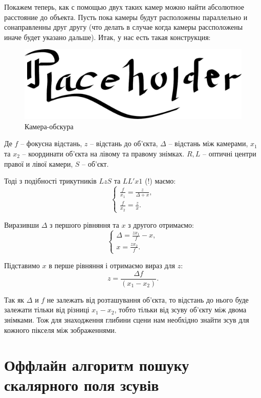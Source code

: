 Покажем теперь, как с помощью двух таких камер можно найти абсолютное расстояние до объекта. Пусть пока камеры будут расположены параллельно и сонаправленны друг другу (что делать в случае когда камеры рассположены иначе будет указано дальше).
Итак, у нас есть такая конструкция:
\begin{figure}[h!]
	\centering
	\includegraphics[scale = 0.7]{placeholder.pdf}
	\caption{Камера-обскура}
	\label{1.1.1 - Camera-obscura}
\end{figure}

Де $f$ -- фокусна відстань, $z$ -- відстань до об'єкта, $\Delta$ -- відстань між камерами, $x_1$ та $x_2$ -- координати об'єкта на лівому та правому знімках. $R, L$ -- оптичні центри правої и лівої камери, $S$ -- об'єкт.
	
Тоді з подібності трикутників $LzS$ та $LL'x1$ (!) маємо:
$$\begin{cases} \frac{f}{x_1} = \frac{z}{\Delta + x} , \\ \frac{f}{x_2} = \frac{z}{x} . \end{cases}$$
	
Виразивши $\Delta$ з першого рівняння та $x$ з другого отримаємо:
$$\begin{cases} \Delta = \frac{z x_1}{f} - x , \\ x = \frac{zx_2}{f} . \end{cases}$$
	
Підставимо $x$ в перше рівняння і отримаємо вираз для $z$:
$$ z = \frac{\Delta f}{(x_1 - x_2)} .$$
	
Так як $\Delta$ и $f$ не залежать від розташування об'єкта, то відстань до нього буде залежати тільки від різниці $x_1 - x_2$, тобто тільки від зсуву об'єкту між двома знімками. Тож для знаходження глибини сцени нам необхідно знайти зсув для кожного пікселя між зображеннями.
	


\section{Оффлайн алгоритм пошуку скалярного поля зсувів}\label{offline}
